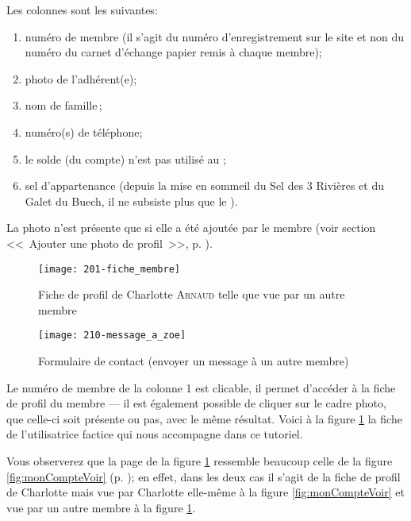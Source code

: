 Les colonnes sont les suivantes: 
\begin{enumerate}
    \item numéro de membre (il s’agit du numéro d’enregistrement sur le site et non du numéro du carnet d’échange papier remis à chaque membre);
    \item photo de l’adhérent(e);
    \item nom de famille\,;
    \item numéro(s) de téléphone;
    \item le solde (du compte) n’est pas utilisé au \CdS;
    \item sel d’appartenance (depuis la mise en sommeil du Sel des 3 Rivières et du Galet du Buech, il ne subsiste plus que le \CdS).
\end{enumerate}
La photo n'est présente que si elle a été ajoutée par le membre (voir section <<~Ajouter une photo de profil~>>, p. \pageref{sec:insererImage}).

\label{sec:ficheProfil}

\begin{figure}
    \centering
    \texttt{[image: 201-fiche\_membre]}
    \caption[Fiche de profil de Charlotte \textsc{Arnaud}]{Fiche de profil de Charlotte \textsc{Arnaud} telle que vue par un autre membre}
    \label{fig:ficheMembre}
\end{figure}
\begin{figure}
    \centering
    \texttt{[image: 210-message\_a\_zoe]}
    \caption[Formulaire de contact]{Formulaire de contact (envoyer un message à un autre membre)}
    \label{fig:envoiMessage}
\end{figure}
Le numéro de membre de la colonne 1 est clicable, il permet d’accéder à la fiche de profil du membre --- il est également possible de cliquer sur le cadre photo, que celle-ci soit présente ou pas, avec le même résultat. Voici à la figure \ref{fig:ficheMembre} la fiche de l'utilisatrice factice qui nous accompagne dans ce tutoriel.

Vous observerez que la page de la figure \ref{fig:ficheMembre} ressemble beaucoup celle de la figure \ref{fig:monCompteVoir} (p. \pageref{fig:monCompteVoir}); en effet, dans les deux cas il s'agit de la fiche de profil de Charlotte mais vue par Charlotte elle-même à la figure \ref{fig:monCompteVoir} et vue par un autre membre à la figure \ref{fig:ficheMembre}.

